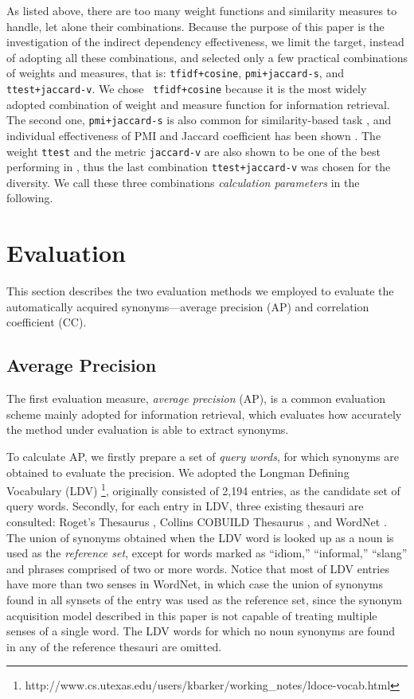 \documentclass[english]{jnlp_1.4}
\begin{document}
As listed above, there are too many weight functions and similarity
measures to handle, let alone their combinations. Because the purpose
of this paper is the investigation of the indirect dependency
effectiveness, we limit the target, instead of adopting all these
combinations, and selected only a few practical combinations of
weights and measures, that is: \verb|tfidf+cosine|,
\verb|pmi+jaccard-s|, and \verb|ttest+jaccard-v|. We chose {\tt
tfidf+cosine} because it is the most widely adopted combination of
weight and measure function for information retrieval. The second one,
{\tt pmi+jaccard-s} is also common for similarity-based task
\cite{Weeds:04}, and individual effectiveness of PMI and Jaccard
coefficient has been shown \cite{Curran:02:improvements}. The weight
{\tt ttest} and the metric {\tt jaccard-v} are also shown to be one of
the best performing in \cite{Curran:02:improvements}, thus the last
combination {\tt ttest+jaccard-v} was chosen for the diversity.  We
call these three combinations {\em calculation parameters} in the
following.

\section{Evaluation}

This section describes the two evaluation methods we employed to
evaluate the automatically acquired synonyms---average precision
(AP) and correlation coefficient (CC).

\subsection{Average Precision}

The first evaluation measure, {\em average precision} (AP), is a common
evaluation scheme mainly adopted for information retrieval, which
evaluates how accurately the method under evaluation is able to
extract synonyms.

To calculate AP, we firstly prepare a set of {\em query words}, for
which synonyms are obtained to evaluate the precision. We adopted the
Longman Defining Vocabulary (LDV)
\footnote{http://www.cs.utexas.edu/users/kbarker/working\_notes/ldoce-vocab.html},
originally consisted of 2,194 entries, as the candidate set of query
words. Secondly, for each entry in LDV, three existing thesauri are
consulted: Roget's Thesaurus \cite{Roget:95}, Collins COBUILD
Thesaurus \cite{Collins:02}, and WordNet \cite{Fellbaum:98}. The union
of synonyms obtained when the LDV word is looked up as a noun is used
as the {\em reference set}, except for words marked as ``idiom,''
``informal,'' ``slang'' and phrases comprised of two or more
words. Notice that most of LDV entries have more than two senses in
WordNet, in which case the union of synonyms found in all synsets of
the entry was used as the reference set, since the synonym acquisition
model described in this paper is not capable of treating multiple
senses of a single word. The LDV words for which no noun synonyms are
found in any of the reference thesauri are omitted.
\end{document}
